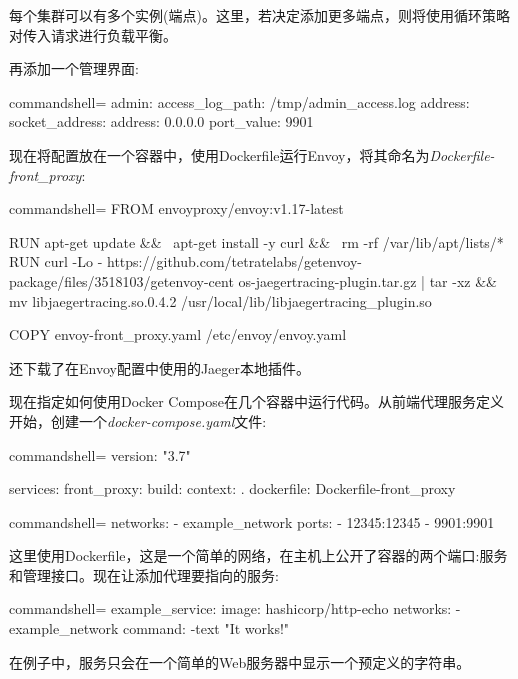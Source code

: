 每个集群可以有多个实例(端点)。这里，若决定添加更多端点，则将使用循环策略对传入请求进行负载平衡。

再添加一个管理界面:

\begin{tcblisting}{commandshell={}}
admin:
  access_log_path: /tmp/admin_access.log
  address:
   socket_address:
     address: 0.0.0.0
     port_value: 9901
\end{tcblisting}

现在将配置放在一个容器中，使用Dockerfile运行Envoy，将其命名为\textit{Dockerfile-front\_proxy}:

\begin{tcblisting}{commandshell={}}
FROM envoyproxy/envoy:v1.17-latest

RUN apt-get update && \
apt-get install -y curl && \
rm -rf /var/lib/apt/lists/*
RUN curl -Lo -
https://github.com/tetratelabs/getenvoy-package/files/3518103/getenvoy-cent
os-jaegertracing-plugin.tar.gz | tar -xz && mv libjaegertracing.so.0.4.2
/usr/local/lib/libjaegertracing_plugin.so

COPY envoy-front_proxy.yaml /etc/envoy/envoy.yaml

\end{tcblisting}

还下载了在Envoy配置中使用的Jaeger本地插件。

现在指定如何使用Docker Compose在几个容器中运行代码。从前端代理服务定义开始，创建一个\textit {docker-compose.yaml}文件:

\begin{tcblisting}{commandshell={}}
version: "3.7"

services:
  front_proxy:
    build:
      context: .
      dockerfile: Dockerfile-front_proxy
\end{tcblisting}
\begin{tcblisting}{commandshell={}}
    networks:
      - example_network
    ports:
      - 12345:12345
      - 9901:9901
\end{tcblisting}

这里使用Dockerfile，这是一个简单的网络，在主机上公开了容器的两个端口:服务和管理接口。现在让添加代理要指向的服务:

\begin{tcblisting}{commandshell={}}
example_service:
  image: hashicorp/http-echo
  networks:
    - example_network
  command: -text "It works!"

\end{tcblisting}

在例子中，服务只会在一个简单的Web服务器中显示一个预定义的字符串。


